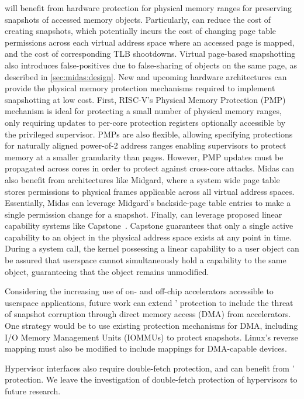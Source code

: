 \midas will benefit from hardware protection for physical memory
ranges for preserving snapshots of accessed memory objects.
Particularly, \midas can reduce the cost of creating snapshots, 
which potentially incurs the cost of changing page table 
permissions across each virtual address space where an accessed page
is mapped, and the cost of corresponding TLB shootdowns.
Virtual page-based snapshotting also introduces false-positives due to
false-sharing of objects on the same page, as described in 
\autoref{sec:midas:design}.
New and upcoming hardware architectures can provide the physical
memory protection mechanisms required to implement snapshotting at low cost.
First, RISC-V's Physical Memory Protection (PMP) mechanism is ideal for
protecting a small number of physical memory ranges, only requiring updates
to per-core protection registers optionally accessible by the privileged
supervisor. 
PMPs are also flexible, allowing specifying protections for naturally aligned
power-of-2 address ranges enabling supervisors to protect memory at a
smaller granularity than pages.
However, PMP updates must be propagated across cores in order to protect
against cross-core attacks.
Midas can also benefit from architectures like Midgard, where a system wide
page table stores permissions to physical frames applicable across all
virtual address spaces.
Essentially, Midas can leverage Midgard's backside-page table entries to
make a single permission change for a snapshot.
Finally, \midas can leverage proposed linear capability systems like 
Capstone~\cite{YuWBCS23CAPSTONE}.
Capstone guarantees that only a single active capability to an object 
in the physical address space exists at any point in time.
During a system call, the kernel possessing a linear capability to 
a user object can be assured that userspace cannot simultaneously hold a 
capability to the same object, guaranteeing that the object remains
unmodified.

Considering the increasing use of on- and off-chip accelerators accessible to
userspace applications, future work can extend \midas' protection to include
the threat of snapshot corruption through direct memory access (DMA)
from accelerators.
One strategy would be to use existing protection mechanisms for DMA, including
I/O Memory Management Units (IOMMUs) to protect snapshots.
Linux's reverse mapping must also be modified to include mappings for 
DMA-capable devices.

Hypervisor interfaces also require double-fetch protection, and can benefit 
from \midas' protection.
We leave the investigation of double-fetch protection of hypervisors to future
research.


